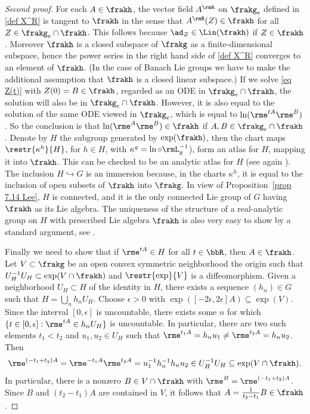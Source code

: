 \begin{proof}[Second proof]
    For each $A\in\frakh$, the vector field $A^\rmR$ on $\frakg_e$ defined in \eqref{def X^R} is tangent to $\frakh$ in the sense that $A^\rmR(Z)\in\frakh$ for all $Z\in\frakg_e\cap\frakh$. This follows because $\ad_Z\in\Lin(\frakh)$ if $Z\in\frakh$. Moreover $\frakh$ is a closed subspace of $\frakg$ as a finite-dimensional subspace, hence the power series in the right hand side of \eqref{def X^R} converges to an element of $\frakh$. (In the case of Banach Lie groups we have to make the additional assumption that $\frakh$ is a closed linear subspace.) If we solve \eqref{eq Z(t)} with $Z(0)=B\in\frakh$, regarded as an ODE in $\frakg_e\cap\frakh$, the solution will also be in $\frakg_e\cap\frakh$. However, it is also equal to the solution of the same ODE viewed in $\frakg_e$, which is equal to $\ln(\rme^{tA}\rme^B)$. So the conclusion is that $\ln(\rme^A\rme^B)\in\frakh$ if $A,B\in\frakg_e\cap\frakh$. Denote by $H$ the subgroup generated by $\exp(\frakh)$, then the chart maps $\restr{\kappa^h}{H}$, for $h\in H$, with $\kappa^g=\ln\circ \rmL_g^{-1}$), form an atlas for $H$, mapping it into $\frakh$. This can be checked to be an analytic atlas for $H$ (see again \cite[Thm.~1.6.3]{DK}). The inclusion $H\hookrightarrow G$ is an immersion because, in the charts $\kappa^h$, it is equal to the inclusion of open subsets of $\frakh$ into $\frakg$. In view of Proposition~\ref{prop 7.14 Lee}, $H$ is connected, and it is the only connected Lie group of $G$ having $\frakh$ as its Lie algebra. The uniqueness of the structure of a real-analytic group on $H$ with prescribed Lie algebra $\frakh$ is also very easy to show by a standard argument, see \cite[Prop.~1.6.4]{DK}.

    Finally we need to show that if $\rme^{tA}\in H$ for all $t\in\bbR$, then $A\in\frakh$. Let $V\subset\frakg$ be an open convex symmetric neighborhood the origin such that $U_H^{-1}U_H\subset \exp(V\cap \frakh)$ and $\restr{\exp}{V}$ is a diffeomorphism. Given a neighborhood $U_H\subset H$ of the identity in $H$, there exists a sequence $(h_n)\in G$ such that $H=\bigcup_n h_nU_H$. Choose $\epsilon>0$ with $\exp([-2\epsilon,2\epsilon]A)\subseteq \exp(V)$. Since the interval $[0,\epsilon]$ is uncountable, there exists some $n$ for which $\{t\in [0,\epsilon]:\rme^{tA}\in h_nU_H\}$ is uncountable. In particular, there are two such elements $t_1<t_2$ and $u_1,u_2\in U_H$ such that $\rme^{t_1A}=h_nu_1\neq \rme^{t_2A}=h_nu_2$. Then
    \[\rme^{(-t_1+t_2)A}=\rme^{-t_1A}\rme^{t_2A}=u_1^{-1}h_n^{-1}h_nu_2\in U_H^{-1}U_H\subseteq \exp(V\cap\frakh).\]
    In particular, there is a nonzero $B\in V\cap\frakh$ with $\rme^B=\rme^{(-t_1+t_2)A}$. Since $B$ and $(t_2-t_1)A$ are contained in $V$, it follows that $A=\frac{1}{t_2-t_1}B\in\frakh$.
 \end{proof}


